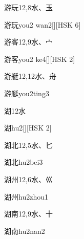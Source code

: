 \begin{Entry}{游玩}{12,8}{⽔、⽟}
  \begin{Phonetics}{游玩}{you2 wan2}[][HSK 6]
  \end{Phonetics}
\end{Entry}

\begin{Entry}{游客}{12,9}{⽔、⼧}
  \begin{Phonetics}{游客}{you2 ke4}[][HSK 2]
  \end{Phonetics}
\end{Entry}

\begin{Entry}{游艇}{12,12}{⽔、⾈}
  \begin{Phonetics}{游艇}{you2ting3}
  \end{Phonetics}
\end{Entry}

\begin{Entry}{湖}{12}{⽔}
  \begin{Phonetics}{湖}{hu2}[][HSK 2]
  \end{Phonetics}
\end{Entry}

\begin{Entry}{湖北}{12,5}{⽔、⼔}
  \begin{Phonetics}{湖北}{hu2bei3}
  \end{Phonetics}
\end{Entry}

\begin{Entry}{湖州}{12,6}{⽔、⼮}
  \begin{Phonetics}{湖州}{hu2zhou1}
  \end{Phonetics}
\end{Entry}

\begin{Entry}{湖南}{12,9}{⽔、⼗}
  \begin{Phonetics}{湖南}{hu2nan2}
  \end{Phonetics}
\end{Entry}

